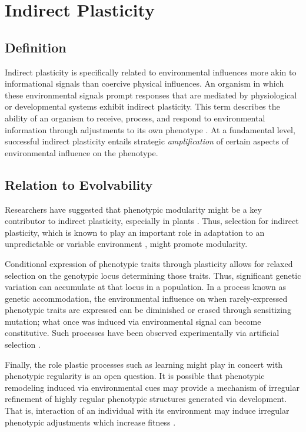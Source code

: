 \section{Indirect Plasticity} \label{sec:indirect_plasticity}

\subsection{Definition}

Indirect plasticity is specifically related to environmental influences more akin to informational signals than coercive physical influences. An organism in which these environmental signals prompt responses that are mediated by physiological or developmental systems exhibit indirect plasticity. This term describes the ability of an organism to receive, process, and respond to environmental information through adjustments to its own phenotype \cite{Fusco2010PhenotypicConcepts}. At a fundamental level, successful indirect plasticity entails strategic \textit{amplification} of certain aspects of environmental influence on the phenotype.

\subsection{Relation to Evolvability}
Researchers have suggested that phenotypic modularity might be a key contributor to indirect plasticity, especially in plants \cite{Schlichting1986ThePlants, DeKroon2005APlants}. Thus, selection for indirect plasticity, which is known to play an important role in adaptation to an unpredictable or variable environment \cite{Fusco2010PhenotypicConcepts}, might promote modularity.

Conditional expression of phenotypic traits through plasticity allows for relaxed selection on the genotypic locus determining those traits. Thus, significant genetic variation can accumulate at that locus in a population. In a process known as genetic accommodation, the environmental influence on when rarely-expressed phenotypic traits are expressed can be diminished or erased through sensitizing mutation; what once was induced via environmental signal can become constitutive. Such processes have been observed experimentally via artificial selection \cite{Moczek2011TheInnovation}.

Finally, the role plastic processes such as learning might play in concert with phenotypic regularity is an open question. It is possible that phenotypic remodeling induced via environmental cues may provide a mechanism of irregular refinement of highly regular phenotypic structures generated via development. That is, interaction of an individual with its environment may induce irregular phenotypic adjustments which increase fitness \cite{Clune2011OnRegularity}.

